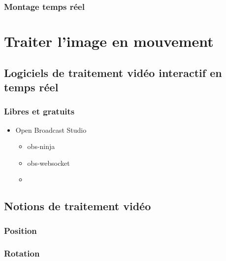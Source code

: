 \documentclass[
]{book}
\providecommand{\tightlist}{%
  \setlength{\itemsep}{0pt}\setlength{\parskip}{0pt}}
\begin{document}
\hypertarget{montage-temps-ruxe9el}{%
\subsection{Montage temps réel}\label{montage-temps-ruxe9el}}

\hypertarget{traiter}{%
\chapter{Traiter l'image en mouvement}\label{traiter}}

\hypertarget{traiter_logiciels}{%
\section{Logiciels de traitement vidéo interactif en temps réel}\label{traiter_logiciels}}

\hypertarget{libres-et-gratuits}{%
\subsection{Libres et gratuits}\label{libres-et-gratuits}}

\begin{itemize}
\tightlist
\item
  Open Broadcast Studio

  \begin{itemize}
  \tightlist
  \item
    obs-ninja
  \item
    obs-websocket
  \item
  \end{itemize}
\end{itemize}

\hypertarget{notions-de-traitement-viduxe9o}{%
\section{Notions de traitement vidéo}\label{notions-de-traitement-viduxe9o}}

\hypertarget{position-1}{%
\subsection{Position}\label{position-1}}

\hypertarget{rotation}{%
\subsection{Rotation}\label{rotation}}
\end{document}
